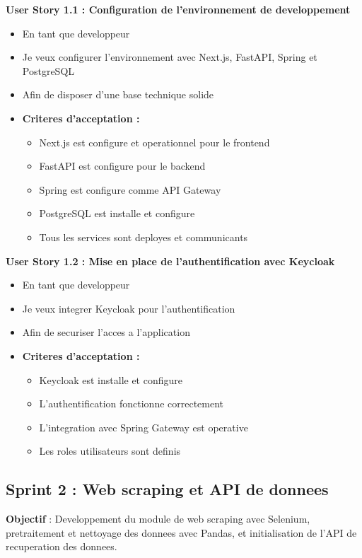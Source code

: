 \textbf{User Story 1.1 : Configuration de l'environnement de developpement}
\begin{itemize}
    \item En tant que developpeur
    \item Je veux configurer l'environnement avec Next.js, FastAPI, Spring et PostgreSQL
    \item Afin de disposer d'une base technique solide
    \item \textbf{Criteres d'acceptation :}
    \begin{itemize}
        \item Next.js est configure et operationnel pour le frontend
        \item FastAPI est configure pour le backend
        \item Spring est configure comme API Gateway
        \item PostgreSQL est installe et configure
        \item Tous les services sont deployes et communicants
    \end{itemize}
\end{itemize}

\textbf{User Story 1.2 : Mise en place de l'authentification avec Keycloak}
\begin{itemize}
    \item En tant que developpeur
    \item Je veux integrer Keycloak pour l'authentification
    \item Afin de securiser l'acces a l'application
    \item \textbf{Criteres d'acceptation :}
    \begin{itemize}
        \item Keycloak est installe et configure
        \item L'authentification fonctionne correctement
        \item L'integration avec Spring Gateway est operative
        \item Les roles utilisateurs sont definis
    \end{itemize}
\end{itemize}

\subsection{Sprint 2 : Web scraping et API de donnees}

\textbf{Objectif} : Developpement du module de web scraping avec Selenium, pretraitement et nettoyage des donnees avec Pandas, et initialisation de l'API de recuperation des donnees.

